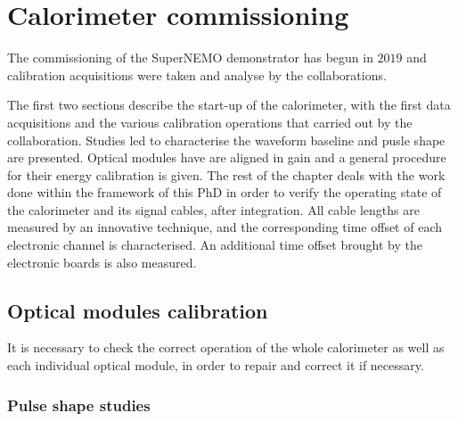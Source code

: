 \chapter{Calorimeter commissioning}
\label{ch:commissioning}


The commissioning of the SuperNEMO demonstrator has begun in $2019$ and calibration acquisitions were taken and analyse by the collaborations.

The first two sections describe the start-up of the calorimeter, with the first data acquisitions and the various calibration operations that carried out by the collaboration.
Studies led to characterise the waveform baseline and pusle shape are presented.
Optical modules have are aligned in gain and a general procedure for their energy calibration is given.
The rest of the chapter deals with the work done within the framework of this PhD in order to verify the operating state of the calorimeter and its signal cables, after integration.
All cable lengths are measured by an innovative technique, and the corresponding time offset of each electronic channel is characterised.
An additional time offset brought by the electronic boards is also measured.

\section{Optical modules calibration}

It is necessary to check the correct operation of the whole calorimeter as well as each individual optical module, in order to repair and correct it if necessary.

\subsection{Pulse shape studies}
\label{subsec:SN_pulse_shape}

